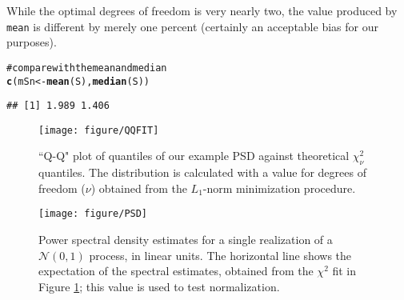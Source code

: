 \documentclass[11pt]{article}\usepackage{graphicx, color}
\makeatletter
\def\maxwidth{ %
  \ifdim\Gin@nat@width>\linewidth
    \linewidth
  \else
    \Gin@nat@width
  \fi
}
\newcommand{\hlfunctioncall}[1]{\textcolor[rgb]{0.501960784313725,0,0.329411764705882}{\textbf{#1}}}%
\newcommand{\hlcomment}[1]{\textcolor[rgb]{0.180392156862745,0.6,0.341176470588235}{#1}}%
\newenvironment{kframe}{%
 \def\at@end@of@kframe{}%
 \ifinner\ifhmode%
  \def\at@end@of@kframe{\end{minipage}}%
  \begin{minipage}{\columnwidth}%
 \fi\fi%
 \def\FrameCommand##1{\hskip\@totalleftmargin \hskip-\fboxsep
 \colorbox{shadecolor}{##1}\hskip-\fboxsep
     \hskip-\linewidth \hskip-\@totalleftmargin \hskip\columnwidth}%
 \MakeFramed {\advance\hsize-\width
   \@totalleftmargin\z@ \linewidth\hsize
   \@setminipage}}%
 {\par\unskip\endMakeFramed%
 \at@end@of@kframe}
\newenvironment{knitrout}{}{} %
\newcommand{\Rcmd}[1]{\texttt{#1}}
\makeatother
\begin{document}
While the optimal degrees of freedom is very nearly two, the
value produced by \Rcmd{mean} is different by merely one percent (certainly
an acceptable bias for our purposes).
\begin{knitrout}
\color{fgcolor}\begin{kframe}
\begin{alltt}
\hlcomment{# compare with the mean and median}
\hlfunctioncall{c}(mSn <- \hlfunctioncall{mean}(S), \hlfunctioncall{median}(S))
\end{alltt}
\begin{verbatim}
## [1] 1.989 1.406
\end{verbatim}
\end{kframe}
\end{knitrout}


\begin{figure}[htb!]
\begin{center}
\begin{knitrout}
\color{fgcolor}
\texttt{[image: figure/QQFIT]} 

\end{knitrout}

\caption{``Q-Q" plot of 
quantiles of our example PSD
 against
 theoretical $\chi^2_\nu$ quantiles.  The distribution is calculated
with a value for degrees of freedom ($\nu$) obtained from the
$L_1$-norm minimization procedure.}
\label{fig:qqchi}
\end{center}
\end{figure}

\begin{figure}[htb!]
\begin{center}
\begin{knitrout}
\color{fgcolor}
\texttt{[image: figure/PSD]} 

\end{knitrout}

\caption{Power spectral density estimates for a single realization of a 
$\mathcal{N}(0,1)$ process, in linear units.  
The horizontal line shows the expectation of the spectral estimates, obtained
from the $\chi^2$ fit in Figure \ref{fig:qqchi}; this value is
used to test normalization.}
\label{fig:psdN}
\end{center}
\end{figure}
\end{document}
